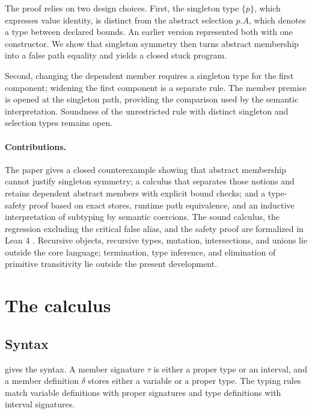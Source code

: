 \documentclass[acmsmall,screen,nonacm]{acmart}
\newcommand{\sing}[1]{\{#1\}}
\begin{document}
The proof relies on two design choices. First, the singleton type
\(\sing{p}\), which expresses value identity, is distinct from the abstract
selection \(p.A\), which denotes a type between declared bounds. An earlier
version represented both with one constructor. We show that singleton
symmetry then turns abstract membership into a false path equality and yields
a closed stuck program.

Second, changing the dependent member requires a singleton type for the first
component; widening the first component is a separate rule. The member premise
is opened at the singleton path, providing the comparison used by the semantic
interpretation. Soundness of the unrestricted rule with distinct singleton
and selection types remains open.

\paragraph{Contributions.}
The paper gives a closed counterexample showing that abstract membership
cannot justify singleton symmetry; a calculus that separates those notions
and retains dependent abstract members with explicit bound checks; and a
type-safety proof based on exact stores, runtime path equivalence, and an
inductive interpretation of subtyping by semantic coercions. The sound
calculus, the regression excluding the critical false alias, and the safety
proof are formalized in Lean 4 \citep{demoura2021lean4}. Recursive objects,
recursive types, mutation,
intersections, and unions lie outside the core language; termination, type
inference, and elimination of primitive transitivity lie outside the present
development.

\section{The calculus}
\label{sec:calculus}

\subsection{Syntax}

 gives the syntax. A member signature \(\tau\) is either a
proper type or an interval, and a member definition \(\delta\) stores either
a variable or a proper type. The typing rules match variable definitions with
proper signatures and type definitions with interval signatures.
\end{document}
